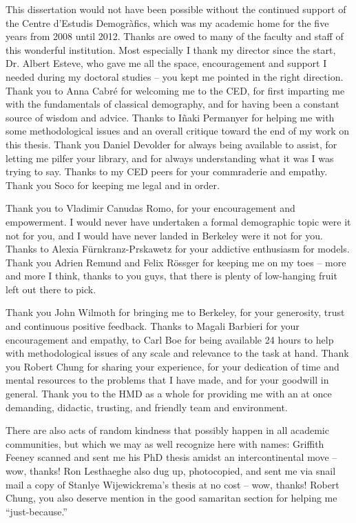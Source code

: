 % 
This dissertation would not have been possible without the continued support of
the Centre d'Estudis Demogr\`{a}fics, which was my academic home for the five
years from 2008 until 2012. Thanks are owed to many of the faculty and
staff of this wonderful institution. Most especially I thank my director since
the start, Dr. Albert Esteve, who gave me all the space, encouragement and
support I needed during my doctoral studies -- you kept me pointed in the right
direction. Thank you to Anna Cabr\'{e} for welcoming me to the CED,
for first imparting me with the fundamentals of classical demography, and for
having been a constant source of wisdom and advice. Thanks to I\~{n}aki
Permanyer for helping me with some methodological issues and an overall critique
toward the end of my work on this thesis. Thank you Daniel Devolder for always
being available to assist, for letting me pilfer your library, and for always
understanding what it was I was trying to say. Thanks to my CED peers for your
commraderie and empathy. Thank you Soco for keeping me legal and in
order.

Thank you to Vladimir Canudas Romo, for your encouragement and
empowerment. I would never have undertaken a formal demographic topic were it
not for you, and I would have never landed in Berkeley were it not for
you. Thanks to Alexia F\"{u}rnkranz-Prskawetz for your addictive enthusiasm for
models. Thank you Adrien Remund and Felix R\"{o}ssger for keeping me on my
toes -- more and more I think, thanks to you guys, that there is plenty of
low-hanging fruit left out there to pick.

Thank you John Wilmoth for bringing me to Berkeley, for your generosity, trust
and continuous positive feedback. Thanks to Magali Barbieri for your
encouragement and empathy, to Carl Boe for being available 24 hours to help with
methodological issues of any scale and relevance to the task at hand. Thank you
Robert Chung for sharing your experience, for your dedication of time
and mental resources to the problems that I have made, and for your goodwill in
general. Thank you to the HMD as a whole for providing me with an at once demanding,
didactic, trusting, and friendly team and environment.

There are also acts of random kindness that possibly happen in all academic
communities, but which we may as well recognize here with names: Griffith Feeney
scanned and sent me his PhD thesis amidst an intercontinental move -- wow,
thanks! Ron Lesthaeghe also dug up, photocopied, and sent me via snail mail a copy
of Stanlye Wijewickrema's thesis at no cost -- wow, thanks! Robert Chung, you
also deserve mention in the good samaritan section for helping me
``just-because.''

